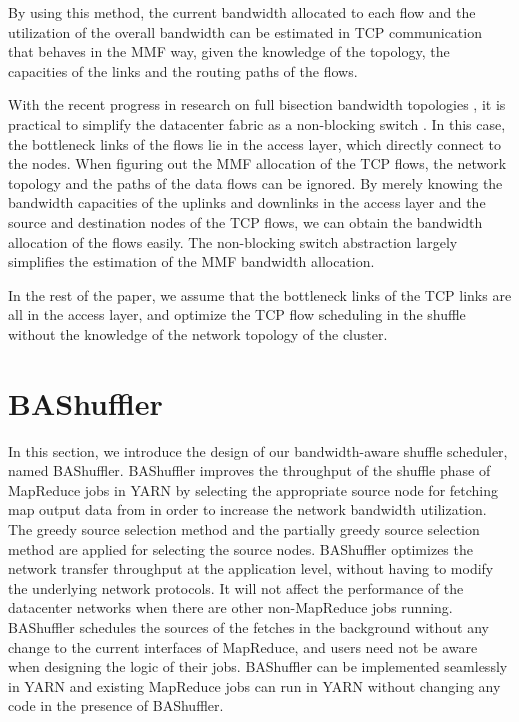 \documentclass[10pt,journal,compsoc]{IEEEtran}
\begin{document}
By using this method, the current bandwidth allocated to
each flow and the utilization of the overall bandwidth can be estimated
in TCP communication that behaves in the MMF way, given
the knowledge of the topology, the capacities of the links and the
routing paths of the flows.

With the recent progress in research on full bisection bandwidth
topologies \cite{greenberg2009vl2, alizadeh2014conga, niranjan2009portland}, 
it is practical to simplify the datacenter fabric as a non-blocking switch \cite{ballani2011towards, chowdhury2011managing, alizadeh2013pfabric, kang2013optimizing, chowdhury2014efficient, chowdhury2015efficient}. 
In this case, the bottleneck links of the flows lie in
the access layer, which directly connect to the nodes.
When figuring out the MMF allocation of the TCP flows,
the network topology and the paths of the data flows
can be ignored. By merely knowing the bandwidth capacities of the
uplinks and downlinks in the access layer
and the source and destination nodes of the TCP flows, we can obtain
the bandwidth allocation of the flows easily. 
The non-blocking switch abstraction largely simplifies the estimation of the MMF bandwidth allocation. 

In the rest of the paper, we assume that the bottleneck links of the
TCP links are all in the access layer,
and optimize the TCP flow scheduling in the shuffle without the
knowledge of the network topology of the cluster.


\section{BAShuffler}\label{section:bashuffler}
In this section, we introduce the design of our
bandwidth-aware shuffle scheduler, named BAShuffler. 
BAShuffler improves the throughput of the shuffle phase of MapReduce jobs in
YARN by selecting the appropriate source node
for fetching map output data from in order to increase the network bandwidth
utilization.
The greedy source selection method and the partially greedy source
selection method are applied for selecting the source nodes. 
BAShuffler optimizes the network transfer throughput at the application level, 
without having to modify the underlying network protocols. 
It will not affect the performance of the datacenter networks when
there are other non-MapReduce jobs running. 
BAShuffler schedules the sources of the fetches in the background
without any change to the current interfaces of MapReduce, and
users need not be aware when designing the logic of their jobs.
BAShuffler can be implemented seamlessly in YARN and
existing MapReduce jobs can run in YARN without changing any code
in the presence of BAShuffler.
\end{document}
